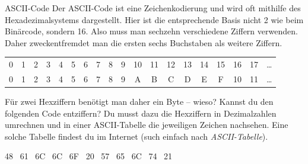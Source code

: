 \documentclass{../../../zirkelblatt}
\begin{document}
\begin{aufgabe}{ASCII-Code}
Der ASCII-Code ist eine Zeichenkodierung und wird oft mithilfe des
Hexadezimalsystems dargestellt. Hier ist die entsprechende Basis nicht 2 wie
beim Binärcode, sondern 16. Also muss man sechzehn verschiedene Ziffern
verwenden. Daher zweckentfremdet man die ersten sechs Buchstaben als weitere
Ziffern.

\begin{tabular}{ccccccccccccccccccc}
  0 & 1 & 2 & 3 & 4 & 5 & 6 & 7 & 8 & 9 & 10 & 11 & 12 & 13 & 14 & 15 & 16 & 17 & \ldots \\
  0 & 1 & 2 & 3 & 4 & 5 & 6 & 7 & 8 & 9 & A  & B  & C  & D  & E  & F & 10 & 11 & \ldots
\end{tabular}

Für zwei Hexziffern benötigt man daher ein Byte -- wieso? Kannst du den
folgenden Code entziffern? Du musst dazu die Hexziffern in Dezimalzahlen
umrechnen und in einer ASCII-Tabelle die jeweiligen Zeichen nachsehen.
Eine solche Tabelle findest du im Internet (such einfach nach \emph{ASCII-Tabelle}).
\begin{center}
48 \ 61 \ 6C \ 6C \ 6F \ 20 \ 57 \ 65 \ 6C \ 74 \ 21
\end{center}
\end{aufgabe}

\pagebreak
\end{document}
